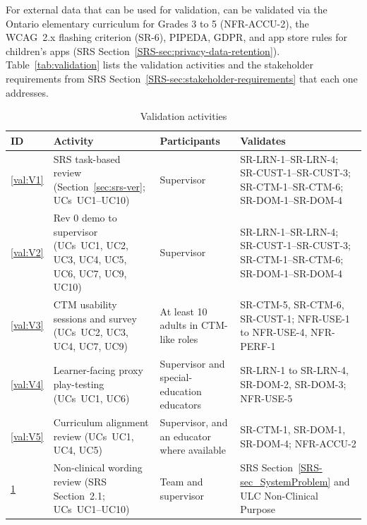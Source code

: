 \documentclass[12pt, titlepage]{article}
\newcommand{\srsref}[1]{#1}
\newcounter{validation}
\newcommand{\srssectionref}[1]{SRS Section~\ref*{SRS-#1}}
\newcommand{\srsnamedref}[2]{#2}
\begin{document}
\label{sec:validation}

For external data that can be used for validation, \progname{} can be validated via the Ontario elementary curriculum for Grades 3 to 5 (\srsref{NFR-ACCU-2}), the WCAG~2.x flashing
criterion (\srsref{SR-6}), PIPEDA, GDPR, and app store rules for children's apps (\srssectionref{sec:privacy-data-retention}). Table~\ref{tab:validation} lists the validation activities and
the stakeholder requirements from \srssectionref{sec:stakeholder-requirements} that each one addresses.

\begin{table}[htbp]
\centering\small
\caption{Validation activities}
\label{tab:validation}
\renewcommand{\arraystretch}{1.2}
\begin{tabularx}{\textwidth}{l >{\raggedright\arraybackslash}p{} >{\raggedright\arraybackslash}p{} >{\raggedright\arraybackslash}X}
\toprule
\textbf{ID} & \textbf{Activity} & \textbf{Participants} & \textbf{Validates}\\
\midrule
{}{validation}\label{val:V1}\ref{val:V1} & SRS task-based review (Section~\ref{sec:srs-ver}; UCs~UC1--UC10) & Supervisor &
\srsref{SR-LRN-1}--\srsref{SR-LRN-4}; \srsref{SR-CUST-1}--\srsref{SR-CUST-3}; \srsref{SR-CTM-1}--\srsref{SR-CTM-6}; \srsref{SR-DOM-1}--\srsref{SR-DOM-4}\\
{validation}\label{val:V2}\ref{val:V2} & Rev 0 demo to supervisor (UCs~UC1, UC2, UC3, UC4, UC5, UC6, UC7, UC9, UC10) & Supervisor &
\srsref{SR-LRN-1}--\srsref{SR-LRN-4}; \srsref{SR-CUST-1}--\srsref{SR-CUST-3}; \srsref{SR-CTM-1}--\srsref{SR-CTM-6}; \srsref{SR-DOM-1}--\srsref{SR-DOM-4}\\
{validation}\label{val:V3}\ref{val:V3} & CTM usability sessions and survey (UCs~UC2, UC3, UC4, UC7, UC9) & At least 10 adults in CTM-like roles &
\srsref{SR-CTM-5}, \srsref{SR-CTM-6}, \srsref{SR-CUST-1}; \srsref{NFR-USE-1} to \srsref{NFR-USE-4}, \srsref{NFR-PERF-1}\\
{validation}\label{val:V4}\ref{val:V4} & Learner-facing proxy play-testing (UCs~UC1, UC6) & Supervisor and special-education
educators & \srsref{SR-LRN-1} to \srsref{SR-LRN-4}, \srsref{SR-DOM-2}, \srsref{SR-DOM-3}; \srsref{NFR-USE-5}\\
{validation}\label{val:V5}\ref{val:V5} & Curriculum alignment review (UCs~UC1, UC4, UC5) & Supervisor, and an educator where
available & \srsref{SR-CTM-1}, \srsref{SR-DOM-1}, \srsref{SR-DOM-4}; \srsref{NFR-ACCU-2}\\
{validation}\label{val:V6}\ref{val:V6} & Non-clinical wording review (SRS Section~2.1; UCs~UC1--UC10) & Team and supervisor & \srssectionref{sec_SystemProblem} and
\srsnamedref{ULC_NonClinicalPurpose}{ULC Non-Clinical Purpose}\\
\bottomrule
\end{tabularx}
\end{table}
\end{document}
